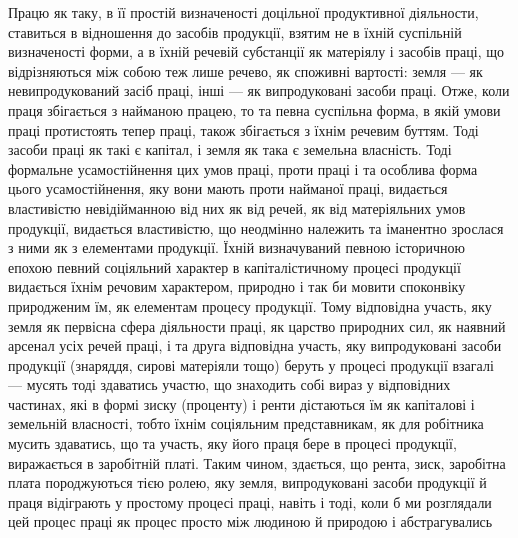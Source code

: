 Працю як таку, в її простій визначеності доцільної продуктивної діяльности,
ставиться в відношення до засобів продукції, взятим не в їхній суспільній
визначеності форми, а в їхній речевій субстанції як матеріялу і засобів праці,
що відрізняються між собою теж лише речево, як споживні вартості: земля —
як невипродукований засіб праці, інші — як випродуковані засоби праці. Отже,
коли праця збігається з найманою працею, то та певна суспільна форма, в
якій умови праці протистоять тепер праці, також збігається з їхнім речевим
буттям. Тоді засоби праці як такі є капітал, і земля як така є земельна
власність. Тоді формальне усамостійнення цих умов праці, проти праці і та
особлива форма цього усамостійнення, яку вони мають проти найманої праці, видається
властивістю невідійманною від них як від речей, як від матеріяльних умов
продукції, видається властивістю, що неодмінно належить та іманентно зрослася
з ними як з елементами продукції. Їхній визначуваний певною історичною
епохою певний соціяльний характер в капіталістичному процесі продукції видається
їхнім речовим характером, природно і так би мовити споконвіку природженим
їм, як елементам процесу продукції. Тому відповідна участь, яку земля
як первісна сфера діяльности праці, як царство природних сил, як наявний
арсенал усіх речей праці, і та друга відповідна участь, яку випродуковані засоби
продукції (знаряддя, сирові матеріяли тощо) беруть у процесі продукції
взагалі — мусять тоді здаватись участю, що знаходить собі вираз у відповідних
частинах, які в формі зиску (проценту) і ренти дістаються їм як капіталові і
земельній власності, тобто їхнім соціяльним представникам, як для робітника
мусить здаватись, що та участь, яку його праця бере в процесі продукції,
виражається в заробітній платі. Таким чином, здається, що рента, зиск, заробітна
плата породжуються тією ролею, яку земля, випродуковані засоби продукції й
праця відіграють у простому процесі праці, навіть і тоді, коли б ми розглядали
цей процес праці як процес просто між людиною й природою і абстрагувались
\parbreak{}  %
